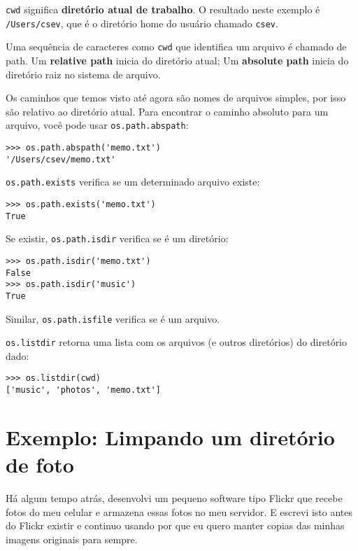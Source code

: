 %
{\tt cwd} significa  {\bf diretório atual de trabalho}. O resultado neste exemplo é 
{\tt /Users/csev}, que é o diretório home do usuário chamado {\tt csev}.


Uma sequência de caracteres como {\tt cwd} que identifica um arquivo é chamado de path.
Um {\bf relative path} inicia do diretório atual;
Um {\bf absolute path} inicia do diretório raiz no sistema de arquivo.




Os caminhos que temos visto até agora são nomes de arquivos simples, por isso são relativo ao diretório atual. Para encontrar o caminho absoluto para um arquivo, você pode usar {\tt os.path.abspath}:

\begin{verbatim}
>>> os.path.abspath('memo.txt')
'/Users/csev/memo.txt'
\end{verbatim}

%
{\tt os.path.exists} verifica se um determinado arquivo existe:


\begin{verbatim}
>>> os.path.exists('memo.txt')
True
\end{verbatim}
%
Se existir, {\tt os.path.isdir} verifica se é um diretório:

\begin{verbatim}
>>> os.path.isdir('memo.txt')
False
>>> os.path.isdir('music')
True
\end{verbatim}

%
Similar, {\tt os.path.isfile} verifica se é um arquivo.

{\tt os.listdir} retorna uma lista com os arquivos (e outros diretórios) do diretório dado:

\begin{verbatim}
>>> os.listdir(cwd)
['music', 'photos', 'memo.txt']
\end{verbatim}
%

\section{Exemplo: Limpando um diretório de foto}

Há algum tempo atrás, desenvolvi um pequeno software tipo Flickr que recebe fotos do meu celular e armazena essas fotos no meu servidor. E escrevi isto antes do Flickr existir e continuo usando por que eu quero manter copias das minhas imagens originais para sempre. 

